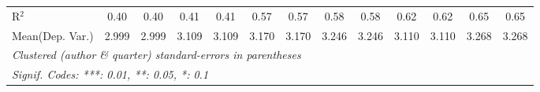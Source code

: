 \begin{tabular}{lcccccccccccc}
   R$^2$                                    & 0.40         & 0.40     & 0.41          & 0.41     & 0.57    & 0.57    & 0.58          & 0.58    & 0.62         & 0.62    & 0.65        & 0.65\\  
Mean(Dep. Var.) & 2.999 & 2.999 & 3.109 & 3.109 & 3.170 & 3.170 & 3.246 & 3.246 & 3.110 & 3.110 & 3.268 & 3.268 \\
   \midrule \midrule
   \multicolumn{13}{l}{\emph{Clustered (author \& quarter) standard-errors in parentheses}}\\
   \multicolumn{13}{l}{\emph{Signif. Codes: ***: 0.01, **: 0.05, *: 0.1}}\\
\end{tabular}
\par\endgroup
